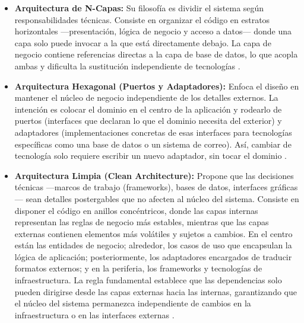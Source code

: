 \begin{itemize}
    \item \textbf{Arquitectura de N-Capas:} Su filosofía es dividir el sistema según responsabilidades técnicas. Consiste en organizar el código en estratos horizontales —presentación, lógica de negocio y acceso a datos— donde una capa solo puede invocar a la que está directamente debajo. 
    La capa de negocio contiene referencias directas a la capa de base de datos, lo que acopla ambas y dificulta la sustitución independiente de tecnologías \cite{microsoft_arch}.
    
    
    \item \textbf{Arquitectura Hexagonal (Puertos y Adaptadores):} Enfoca el diseño en mantener el núcleo de negocio independiente de los detalles externos. 
    La intención es colocar el dominio en el centro de la aplicación y rodearlo de puertos (interfaces que declaran lo que el dominio necesita del exterior) y adaptadores (implementaciones concretas de esas interfaces para tecnologías específicas como una base de datos o un sistema de correo).     
    Así, cambiar de tecnología solo requiere escribir un nuevo adaptador, sin tocar el dominio \cite{cockburn2005, aws_hexagonal}.
    
    
    \item \textbf{Arquitectura Limpia (Clean Architecture):} Propone que las decisiones técnicas —marcos de trabajo (frameworks), bases de datos, interfaces gráficas— sean detalles postergables que no afecten al núcleo del sistema. 
    Consiste en disponer el código en anillos concéntricos, donde las capas internas representan las reglas de negocio más estables, mientras que las capas externas contienen elementos más volátiles y sujetos a cambios.
    En el centro están las entidades de negocio; alrededor, los casos de uso que encapsulan la lógica de aplicación; posteriormente, los adaptadores encargados de traducir formatos externos; y en la periferia, los frameworks y tecnologías de infraestructura. 
    La regla fundamental establece que las dependencias solo pueden dirigirse desde las capas externas hacia las internas, garantizando que el núcleo del sistema permanezca independiente de cambios en la infraestructura o en las interfaces externas \cite{martin2018}.

\end{itemize}


